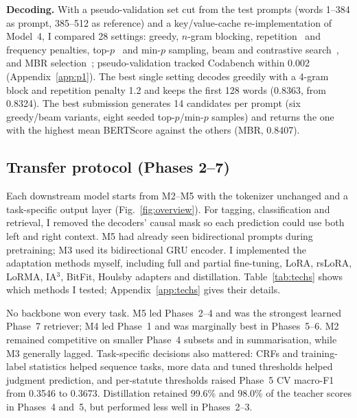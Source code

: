 \documentclass[11pt, oneside]{article}
\begin{document}
\textbf{Decoding.} With a pseudo-validation set cut from the test prompts (words 1--384 as prompt, 385--512 as
reference) and a key/value-cache re-implementation of Model~4, I compared 28 settings: greedy, $n$-gram blocking,
repetition~\cite{ctrl} and frequency penalties, top-$p$~\cite{nucleus} and min-$p$ sampling, beam and contrastive
search~\cite{contrastive}, and MBR selection~\cite{mbr}; pseudo-validation tracked Codabench within 0.002
(Appendix~\ref{app:p1}). The best single setting decodes greedily with a 4-gram block and repetition penalty 1.2 and
keeps the first 128 words (0.8363, from 0.8324). The best submission generates 14 candidates per prompt (six
greedy/beam variants, eight seeded top-$p$/min-$p$ samples) and returns the one with the highest mean BERTScore against
the others (MBR, 0.8407).

\subsection{Transfer protocol (Phases 2--7)}
Each downstream model starts from M2--M5 with the tokenizer unchanged and a task-specific output layer
(Fig.~\ref{fig:overview}). For tagging, classification and retrieval, I removed the decoders' causal mask so each
prediction could use both left and right context. M5 had already seen bidirectional prompts during pretraining;
M3 used its bidirectional GRU encoder. I implemented the adaptation methods myself, including full and partial
fine-tuning, LoRA, rsLoRA, LoRMA, IA$^3$, BitFit, Houlsby adapters and distillation. Table~\ref{tab:techs} shows
which methods I tested; Appendix~\ref{app:techs} gives their details.

No backbone won every task. M5 led Phases~2--4 and was the strongest learned Phase~7 retriever; M4 led Phase~1 and
was marginally best in Phases~5--6. M2 remained competitive on smaller Phase~4 subsets and in summarisation, while
M3 generally lagged. Task-specific decisions also mattered: CRFs and training-label statistics helped sequence
tasks, more data and tuned thresholds helped judgment prediction, and per-statute thresholds raised Phase~5 CV
macro-F1 from 0.3546 to 0.3673. Distillation retained 99.6\% and 98.0\% of the teacher scores in Phases~4 and~5,
but performed less well in Phases~2--3.
\end{document}
